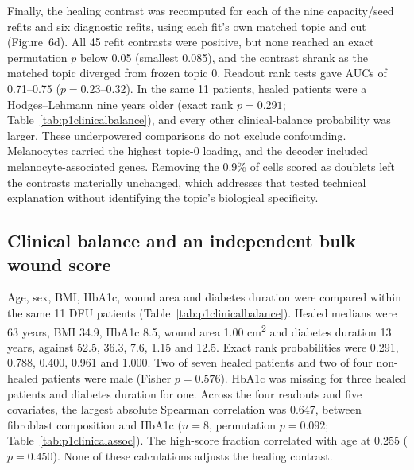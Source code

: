 \documentclass[10pt,a4paper]{article}
\begin{document}
Finally, the healing contrast was recomputed for each of the nine capacity/seed refits and six diagnostic refits, using each fit's own matched topic and cut (Figure~6d). All 45 refit contrasts were positive, but none reached an exact permutation $p$ below 0.05 (smallest 0.085), and the contrast shrank as the matched topic diverged from frozen topic 0. Readout rank tests gave AUCs of 0.71--0.75 ($p=0.23$--0.32). In the same 11 patients, healed patients were a Hodges--Lehmann nine years older (exact rank $p=0.291$; Table~\ref{tab:p1clinicalbalance}), and every other clinical-balance probability was larger. These underpowered comparisons do not exclude confounding. Melanocytes carried the highest topic-0 loading, and the decoder included melanocyte-associated genes. Removing the 0.9\% of cells scored as doublets left the contrasts materially unchanged, which addresses that tested technical explanation without identifying the topic's biological specificity.




\subsection{Clinical balance and an independent bulk wound score}

Age, sex, BMI, HbA1c, wound area and diabetes duration were compared within the same 11 DFU patients (Table~\ref{tab:p1clinicalbalance}). Healed medians were 63 years, BMI 34.9, HbA1c 8.5, wound area 1.00 cm\textsuperscript{2} and diabetes duration 13 years, against 52.5, 36.3, 7.6, 1.15 and 12.5. Exact rank probabilities were 0.291, 0.788, 0.400, 0.961 and 1.000. Two of seven healed patients and two of four non-healed patients were male (Fisher $p=0.576$). HbA1c was missing for three healed patients and diabetes duration for one. Across the four readouts and five covariates, the largest absolute Spearman correlation was 0.647, between fibroblast composition and HbA1c ($n=8$, permutation $p=0.092$; Table~\ref{tab:p1clinicalassoc}). The high-score fraction correlated with age at 0.255 ($p=0.450$). None of these calculations adjusts the healing contrast.
\end{document}
